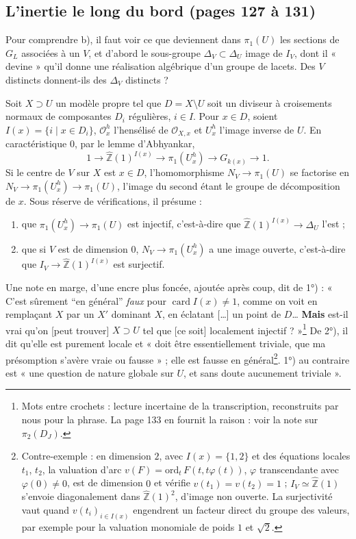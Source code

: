 \documentclass[11pt,a4paper]{article}
\begin{document}
\subsection*{L'inertie le long du bord (pages 127 à 131)}

Pour comprendre b), il faut voir ce que deviennent dans $\pi_1(U)$ les
sections de $G_L$ associées à un $V$, et d'abord le sous-groupe $\Delta_V
\subset \Delta_U$ image de $I_V$, dont il « devine » qu'il donne une réalisation
algébrique d'un groupe de lacets. Des $V$ distincts donnent-ils des $\Delta_V$
distincts ?

Soit $X \supset U$ un modèle propre tel que $D = X \setminus U$ soit un
diviseur à croisements normaux de composantes $D_i$ régulières, $i \in I$. Pour
$x \in D$, soient $I(x) = \{i \mid x \in D_i\}$, $\mathcal{O}^h_x$ l'hensélisé
de $\mathcal{O}_{X,x}$ et $U^h_x$ l'image inverse de $U$. En caractéristique
$0$, par le lemme d'Abhyankar,
\[
1 \longrightarrow \widehat{\mathbb{Z}}(1)^{I(x)} \longrightarrow
\pi_1(U^h_x) \longrightarrow G_{k(x)} \longrightarrow 1 .
\]
Si le centre de $V$ sur $X$ est $x \in D$, l'homomorphisme $N_V \to \pi_1(U)$ se
factorise en $N_V \to \pi_1(U^h_x) \to \pi_1(U)$, l'image du second étant le
groupe de décomposition de $x$. Sous réserve de vérifications, il présume :

\begin{enumerate}
\item[1°)] que $\pi_1(U^h_x) \to \pi_1(U)$ est injectif, c'est-à-dire que
$\widehat{\mathbb{Z}}(1)^{I(x)} \to \Delta_U$ l'est ;
\item[2°)] que si $V$ est de dimension $0$, $N_V \to \pi_1(U^h_x)$ a une image
ouverte, c'est-à-dire que $I_V \to \widehat{\mathbb{Z}}(1)^{I(x)}$ est
surjectif.
\end{enumerate}

Une note en marge, d'une encre plus foncée, ajoutée après coup, dit de 1°) :
« C'est sûrement “en général” \emph{faux} pour $\operatorname{card} I(x) \ne
1$, comme on voit en remplaçant $X$ par un $X'$ dominant $X$, en éclatant […]
un point de $D$… \textbf{Mais} est-il vrai qu'on [peut trouver] $X \supset U$
tel que [ce soit] localement injectif ? »\footnote{Mots entre crochets : lecture
incertaine de la transcription, reconstruits par nous pour la phrase. La page
133 en fournit la raison : voir la note sur $\pi_2(D_J)$.} De 2°), il dit qu'elle
est purement locale et « doit être essentiellement triviale, que ma
présomption s'avère vraie ou fausse » ; elle est fausse en
général\footnote{Contre-exemple : en dimension $2$, avec $I(x) = \{1, 2\}$ et
des équations locales $t_1$, $t_2$, la valuation d'arc $v(F) =
\mathrm{ord}_t\, F(t, t\varphi(t))$, $\varphi$ transcendante avec $\varphi(0)
\ne 0$, est de dimension $0$ et vérifie $v(t_1) = v(t_2) = 1$ ; $I_V \simeq
\widehat{\mathbb{Z}}(1)$ s'envoie diagonalement dans
$\widehat{\mathbb{Z}}(1)^2$, d'image non ouverte. La surjectivité vaut quand
$v(t_i)_{i \in I(x)}$ engendrent un facteur direct du groupe des valeurs,
par exemple pour la valuation monomiale de poids $1$ et $\sqrt{2}$.}. 1°) au contraire est « une question
de nature globale sur $U$, et sans doute aucunement triviale ».
\end{document}
